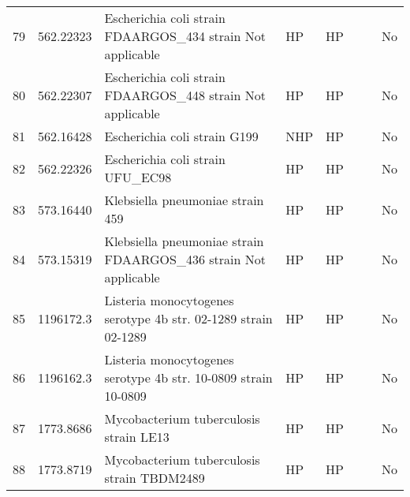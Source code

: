 \begin{tabular}{llllllll}
79  &   562.22323 &       Escherichia coli strain FDAARGOS\_434 strain Not applicable &            HP &              HP &                                              \cite{562.22323} &                                  &            No \\
80  &   562.22307 &       Escherichia coli strain FDAARGOS\_448 strain Not applicable &            HP &              HP &                                              \cite{562.22307} &                                  &            No \\
81  &   562.16428 &                                      Escherichia coli strain G199 &           NHP &              HP &                                    \cite{johnson2016separate} &                                  &            No \\
82  &   562.22326 &                                 Escherichia coli strain UFU\_EC98 &            HP &              HP &                                              \cite{562.22326} &                                  &            No \\
83  &   573.16440 &                                  Klebsiella pneumoniae strain 459 &            HP &              HP &                                              \cite{573.16440} &   \cite{chi2019characterization} &            No \\
84  &   573.15319 &  Klebsiella pneumoniae strain FDAARGOS\_436 strain Not applicable &            HP &              HP &                                              \cite{573.15319} &   \cite{chi2019characterization} &            No \\
85  &   1196172.3 &    Listeria monocytogenes serotype 4b str. 02-1289 strain 02-1289 &            HP &              HP &                                              \cite{1196172.3} &         \cite{muchaamba2017full} &            No \\
86  &   1196162.3 &    Listeria monocytogenes serotype 4b str. 10-0809 strain 10-0809 &            HP &              HP &                                              \cite{1196162.3} &         \cite{muchaamba2017full} &            No \\
87  &   1773.8686 &                            Mycobacterium tuberculosis strain LE13 &            HP &              HP &                                      \cite{sheen2017multiple} &                                  &            No \\
88  &   1773.8719 &                        Mycobacterium tuberculosis strain TBDM2489 &            HP &              HP &                                      \cite{sheen2017multiple} &                                  &            No \\

\end{tabular}
